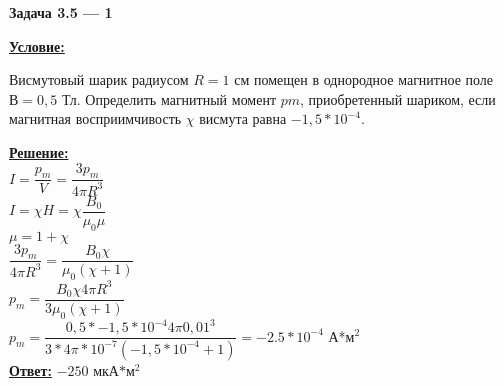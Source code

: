 
\begin{center}
    \textbf{Задача 3.5 --- 1}
\end{center}

\underline{\textbf{Условие:}}

Висмутовый шарик радиусом 
$ R = 1 $ см помещен в однородное магнитное поле 
$ В = 0,5 $ Тл. Определить магнитный момент 
$ pm $, приобретенный шариком, 
если магнитная восприимчивость $ \chi $ висмута равна 
$ -1,5 * 10^{-4} $.

\underline{\textbf{Решение:}}\\

$ I = \dfrac{p_m}{V} = \dfrac{3p_m}{4\pi R^3} $\\

$ I = \chi H = \chi \dfrac{B_0}{\mu_0\mu} $\\

$ \mu = 1 + \chi $\\

$ \dfrac{3p_m}{4\pi R^3} = \dfrac{B_0\chi}{\mu_0(\chi + 1)} $\\

$ p_m = \dfrac{B_0 \chi 4 \pi R^3}{3\mu_0(\chi + 1)} $\\

$ p_m = 
\dfrac
{0,5 * -1,5 * 10^{-4}  4 \pi 0,01^3}
{3 * 4 \pi * 10^{-7} (-1,5 * 10^{-4}  + 1)} =
- 2.5 * 10^{-4} 
$ А*м$^2$\\


\underline{\textbf{Ответ:}}
$ -250 $ мкА$*$м$^2$\\
